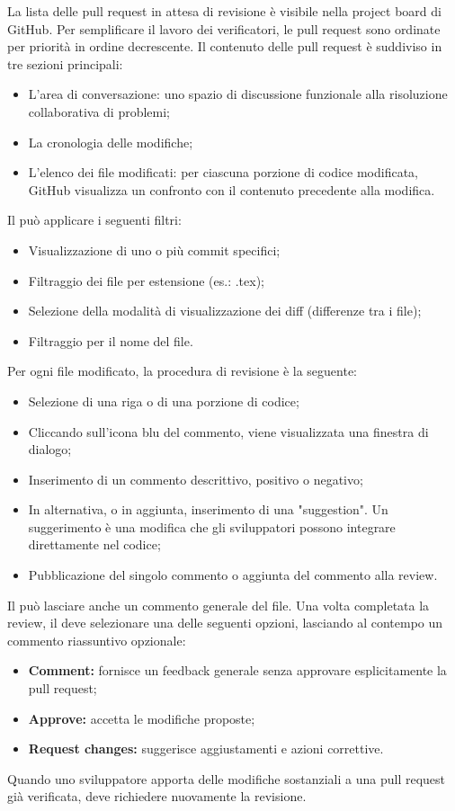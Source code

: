 \par La lista delle pull request in attesa di revisione è visibile nella project board di GitHub. Per semplificare il lavoro dei verificatori, le pull request sono ordinate per priorità in ordine decrescente. Il contenuto delle pull request è suddiviso in tre sezioni principali:
\begin{itemize}
  \item L'area di conversazione: uno spazio di discussione funzionale alla risoluzione collaborativa di problemi;
  \item La cronologia delle modifiche;
  \item L'elenco dei file modificati: per ciascuna porzione di codice modificata, GitHub visualizza un confronto con il contenuto precedente alla modifica.
\end{itemize}
\par Il \Verificatore{} può applicare i seguenti filtri:
\begin{itemize}
  \item Visualizzazione di uno o più commit specifici;
  \item Filtraggio dei file per estensione (es.: .tex);
  \item Selezione della modalità di visualizzazione dei diff (differenze tra i file);
  \item Filtraggio per il nome del file.
\end{itemize}
\par Per ogni file modificato, la procedura di revisione è la seguente:
\begin{itemize}
  \item Selezione di una riga o di una porzione di codice;
  \item Cliccando sull'icona blu del commento, viene visualizzata una finestra di dialogo;
  \item Inserimento di un commento descrittivo, positivo o negativo;
  \item In alternativa, o in aggiunta, inserimento di una "suggestion". Un suggerimento è una modifica che gli sviluppatori possono integrare direttamente nel codice;
  \item Pubblicazione del singolo commento o aggiunta del commento alla review.
\end{itemize}
\par Il \Verificatore{} può lasciare anche un commento generale del file. Una volta completata la review, il \Verificatore{} deve selezionare una delle seguenti opzioni, lasciando al contempo un commento riassuntivo opzionale:
\begin{itemize}
  \item \textbf{Comment:} fornisce un feedback generale senza approvare esplicitamente la pull request;
  \item \textbf{Approve:} accetta le modifiche proposte;
  \item \textbf{Request changes:} suggerisce aggiustamenti e azioni correttive.
\end{itemize}
\par Quando uno sviluppatore apporta delle modifiche sostanziali a una pull request già verificata, deve richiedere nuovamente la revisione.

